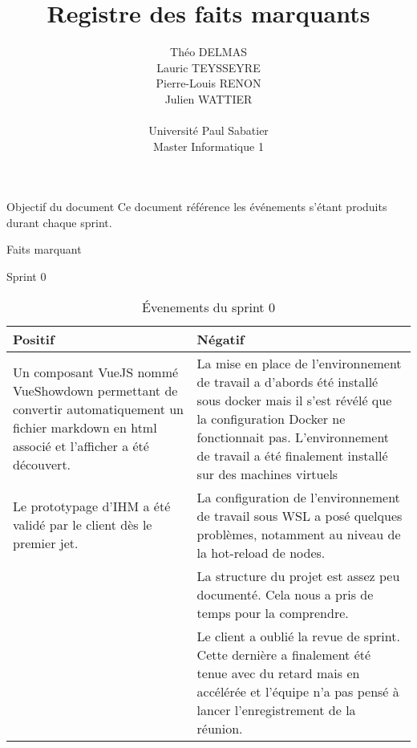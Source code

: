 \documentclass[]{article}
\title{Registre des faits marquants}
\author{
    Théo DELMAS\\
    Lauric TEYSSEYRE\\
    Pierre-Louis RENON\\
    Julien WATTIER\\
    \\
    Université Paul Sabatier\\
    Master Informatique 1\\
   }
\begin{document}
\maketitle
\newpage
\tableofcontents
\newpage

\begin{section}{Objectif du document}
 Ce document référence les événements s'étant produits durant chaque sprint.
\end{section}

{
\setlength{\parindent}{0pt} %
\begin{section}{Faits marquant}
    \begin{subsection}{Sprint 0}
        \begin{table}[H]
            \caption{Évenements du sprint 0}
            \begin{tabularx}{\columnwidth}{|X|X|}
                \hline
                \cellcolor[HTML]{17FF00}Positif & \cellcolor[HTML]{FF2D00}Négatif\\
                \hline
                Un composant VueJS nommé VueShowdown permettant de convertir automatiquement un fichier markdown en html associé et l'afficher a été découvert.& La mise en place de l'environnement de travail a d'abords été installé sous docker mais il s'est révélé que la configuration Docker ne fonctionnait pas. L'environnement de travail a été finalement installé sur des machines virtuels\\
                \hline
                Le prototypage d'IHM a été validé par le client dès le premier jet. & La configuration de l'environnement de travail sous WSL a posé quelques problèmes, notamment au niveau de la hot-reload de nodes.\\
                \hline
                & La structure du projet est assez peu documenté. Cela nous a pris de temps pour la comprendre.\\
                \hline
                & Le client a oublié la revue de sprint. Cette dernière a finalement été tenue avec du retard mais en accélérée et l'équipe n'a pas pensé à lancer l'enregistrement de la réunion.\\
                \hline
            \end{tabularx}
        \end{table}
    \end{subsection}


\end{section}}
\end{document}
